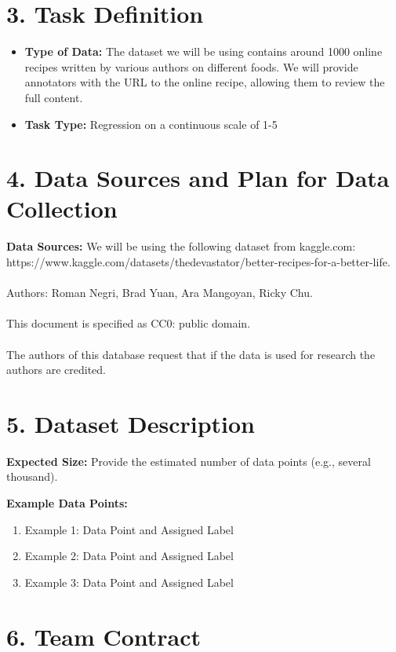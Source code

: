 \documentclass{article}
\begin{document}
\section*{3. Task Definition}
\begin{itemize}
    \item \textbf{Type of Data:} 
    The dataset we will be using contains around 1000 online recipes written by various authors on different foods. We will provide annotators with the URL to the online recipe, allowing them to review the full content.
    \item \textbf{Task Type:} Regression on a continuous scale of 1-5
\end{itemize}

\section*{4. Data Sources and Plan for Data Collection}
\textbf{Data Sources:} We will be using the following dataset from kaggle.com:\\
https://www.kaggle.com/datasets/thedevastator/better-recipes-for-a-better-life.\\\\
Authors: Roman Negri, Brad Yuan, Ara Mangoyan, Ricky Chu.\\\\
This document is specified as CC0: public domain.\\\\
The authors of this database request that if the data is used for research the authors are credited.

\section*{5. Dataset Description}
\textbf{Expected Size:} Provide the estimated number of data points (e.g., several thousand).

\textbf{Example Data Points:}
\begin{enumerate}
    \item Example 1: Data Point and Assigned Label
    \item Example 2: Data Point and Assigned Label
    \item Example 3: Data Point and Assigned Label
\end{enumerate}

\section*{6. Team Contract}
\end{document}
